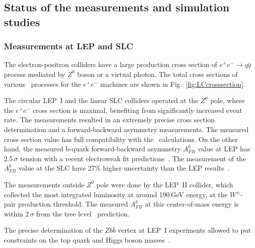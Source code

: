 %
\subsection{Status of the measurements and simulation studies}

\subsubsection{Measurements at LEP and SLC}
The electron-positron colliders have a large production cross section of $e^+e^- \to q\bar{q}$ process mediated by $Z^0$ boson or a virtual photon. The total cross sections of various \sm\ processes for the $e^+e^-$ machines are shown in Fig.~\ref{fig:LCcrosssection}.

The circular LEP~I and the linear SLC colliders operated at the $Z^0$ pole, where the $e^+e^-$ cross section is maximal, benefiting from significantly increased event rate. 
The measurements resulted in an extremely precise cross section determination and a forward-backward asymmetry measurements. 
The measured cross section value has full compatibility with the \sm\ calculations. 
On the other hand, the measured b-quark forward-backward asymmetry $A_{FB}^b$  value at LEP has 2.5\,$\sigma$ tension with a recent electroweak fit predictions~\cite{bib:AfbSMFit}.
The measurement of the $A_{FB}^b$ value at the SLC have 27\% higher uncertainty than the LEP results~\cite{bib:SLC}.

The measurements outside $Z^0$ pole were done by the LEP~II collider, which collected the most integrated luminosity at around 190\,GeV energy, at the $W^\pm$-pair production threshold. 
The measured $A_{FB}^b$ at this center-of-mass energy is within 2\,$\sigma$ from the tree level \sm\ prediction.

The precise determination of the $Zb\bar{b}$ vertex at LEP~I experiments allowed to put constraints on the top quark and Higgs boson masses~\cite{bib:LEPTOP}.

